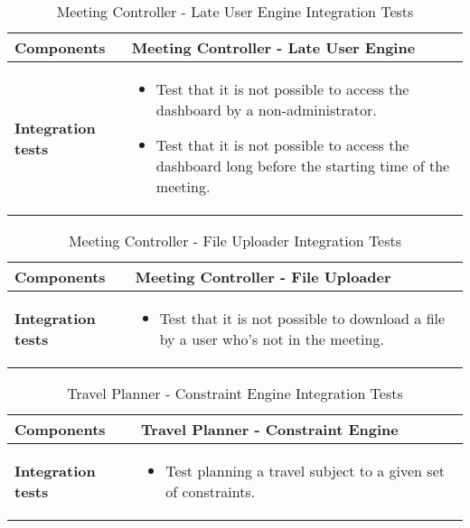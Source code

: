 \begin{table}[H]	
	\centering
	\def\arraystretch{1.5}
	\begin{tabular}{|m{4cm}|m{12cm}|}
		\hline
		\textbf{Components} & Meeting Controller - Late User Engine \\ \hline
		\textbf{Integration tests} & 
			\begin{itemize}
			\item Test that it is not possible to access the dashboard by a non-administrator.
			\item Test that it is not possible to access the dashboard long before the starting time of the meeting.
			\end{itemize} \\ \hline
	\end{tabular}
	\caption{Meeting Controller - Late User Engine Integration Tests}
\end{table}

\begin{table}[H]	
	\centering
	\def\arraystretch{1.5}
	\begin{tabular}{|m{4cm}|m{12cm}|}
		\hline
		\textbf{Components} & Meeting Controller - File Uploader \\ \hline
		\textbf{Integration tests} & 
			\begin{itemize}
			\item Test that it is not possible to download a file by a user who's not in the meeting.
			\end{itemize}  \\ \hline
	\end{tabular}
	\caption{Meeting Controller - File Uploader Integration Tests}
\end{table}

\begin{table}[H]	
	\centering
	\def\arraystretch{1.5}
	\begin{tabular}{|m{4cm}|m{12cm}|}
		\hline
		\textbf{Components} & Travel Planner - Constraint Engine \\ \hline
		\textbf{Integration tests} & 
			\begin{itemize}
			\item Test planning a travel subject to a given set of constraints.
			\end{itemize} \\ \hline
	\end{tabular}
	\caption{Travel Planner - Constraint Engine Integration Tests}
\end{table}


